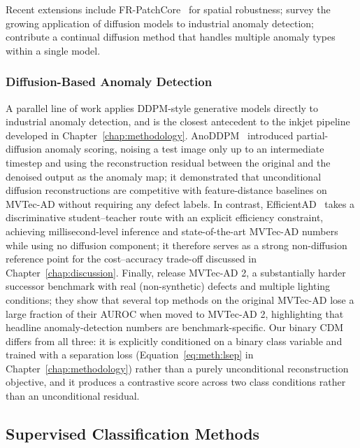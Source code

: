Recent extensions include FR-PatchCore~\cite{jiang2024frpatchcore} for spatial robustness; \textcite{wang2025industrial} survey the growing application of diffusion models to industrial anomaly detection; \textcite{li2025oneformore} contribute a continual diffusion method that handles multiple anomaly types within a single model.

\subsubsection{Diffusion-Based Anomaly Detection}
\label{sec:bg:industrial:diffusion-anomaly}

A parallel line of work applies DDPM-style generative models directly to industrial anomaly detection, and is the closest antecedent to the inkjet pipeline developed in Chapter~\ref{chap:methodology}. AnoDDPM~\cite{wyatt2022anoddpm} introduced partial-diffusion anomaly scoring, noising a test image only up to an intermediate timestep and using the reconstruction residual between the original and the denoised output as the anomaly map; it demonstrated that unconditional diffusion reconstructions are competitive with feature-distance baselines on MVTec-AD without requiring any defect labels. In contrast, EfficientAD~\cite{batzner2024efficientad} takes a discriminative student--teacher route with an explicit efficiency constraint, achieving millisecond-level inference and state-of-the-art MVTec-AD numbers while using no diffusion component; it therefore serves as a strong non-diffusion reference point for the cost--accuracy trade-off discussed in Chapter~\ref{chap:discussion}. Finally, \textcite{heckler2024mvtec} release MVTec-AD 2, a substantially harder successor benchmark with real (non-synthetic) defects and multiple lighting conditions; they show that several top methods on the original MVTec-AD lose a large fraction of their AUROC when moved to MVTec-AD 2, highlighting that headline anomaly-detection numbers are benchmark-specific. Our binary CDM differs from all three: it is explicitly conditioned on a binary class variable and trained with a separation loss (Equation~\ref{eq:meth:lsep} in Chapter~\ref{chap:methodology}) rather than a purely unconditional reconstruction objective, and it produces a contrastive score across two class conditions rather than an unconditional residual.

\subsection{Supervised Classification Methods}
\label{sec:bg:industrial:supervised}


